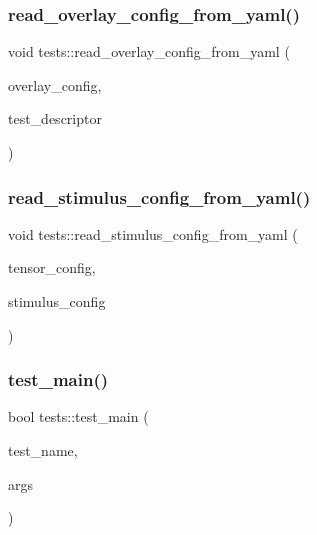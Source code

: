 \subsubsection{\texorpdfstring{read\+\_\+overlay\+\_\+config\+\_\+from\+\_\+yaml()}{read\_overlay\_config\_from\_yaml()}}
{\footnotesize\ttfamily void tests\+::read\+\_\+overlay\+\_\+config\+\_\+from\+\_\+yaml (\begin{DoxyParamCaption}\item[{\hyperlink{structtests_1_1OverlayConfig}{Overlay\+Config} \&}]{overlay\+\_\+config,  }\item[{Y\+A\+M\+L\+::\+Node \&}]{test\+\_\+descriptor }\end{DoxyParamCaption})}

\mbox{\label{namespacetests_abe44eff5730d1364f1e3091891f544f8}} 
\subsubsection{\texorpdfstring{read\+\_\+stimulus\+\_\+config\+\_\+from\+\_\+yaml()}{read\_stimulus\_config\_from\_yaml()}}
{\footnotesize\ttfamily void tests\+::read\+\_\+stimulus\+\_\+config\+\_\+from\+\_\+yaml (\begin{DoxyParamCaption}\item[{\hyperlink{structtests_1_1TensorConfig}{Tensor\+Config} \&}]{tensor\+\_\+config,  }\item[{const Y\+A\+M\+L\+::\+Node \&}]{stimulus\+\_\+config }\end{DoxyParamCaption})}

\mbox{\label{namespacetests_a124130b57e269bc86797bf0ab02e9c24}} 
\subsubsection{\texorpdfstring{test\+\_\+main()}{test\_main()}}
{\footnotesize\ttfamily bool tests\+::test\+\_\+main (\begin{DoxyParamCaption}\item[{std\+::string}]{test\+\_\+name,  }\item[{\hyperlink{structtests_1_1TestArgs}{tests\+::\+Test\+Args}}]{args }\end{DoxyParamCaption})}

